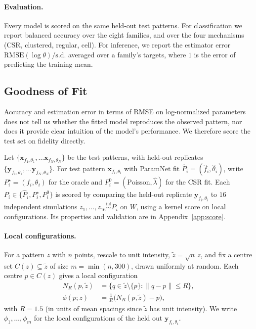 \documentclass[twoside]{article}
\newcommand{\pc}{\mathbf{x}}
\newcommand{\rc}{\mathbf{y}}
\begin{document}
\paragraph{Evaluation.} Every model is scored on the same held-out test patterns. For classification we report
balanced accuracy over the eight families, and over the four mechanisms (CSR, clustered, regular, cell). For
inference, we report the estimator error $\mathrm{RMSE}(\log\theta)/\mathrm{s.d.}$ averaged over a family's targets,
where $1$ is the error of predicting the training mean.


\subsection{Goodness of Fit}
\label{sec:score}

Accuracy and estimation error in terms of RMSE on log-normalized parameters does not tell us whether the fitted model reproduces the observed pattern, nor does it provide clear intuition of the model's performance. We therefore score the test set on fidelity directly.

Let $\{\pc_{f_1, \theta_1}, \dots \pc_{f_N, \theta_N}\}$ be the test patterns, with held-out replicates $\{\rc_{f_1, \theta_1}, \dots \rc_{f_N, \theta_N}\}$. For test pattern $\pc_{f_i, \theta_i}$ with ParamNet fit $\hat P_i=(\hat f_i,\hat\theta_i)$, write $P^\star_i=(f_i,\theta_i)$ for the oracle and $P^0_i = (\text{Poisson}, \hat \lambda)$ for the CSR fit. Each $P_i\in\{\hat P_i,P^\star_i,P^0_i\}$ is scored by comparing the held-out replicate $\rc_{f_i, \theta_i}$ to $16$ independent simulations $z_1,\dots,z_{16}\stackrel{\text{iid}}\sim P_i$ on $W$, using a kernel score on local configurations. Its properties and validation are in Appendix~\ref{app:score}.

\paragraph{Local configurations.}
For a pattern $z$ with $n$ points, rescale to unit intensity, $\tilde z=\sqrt n\,z$, and fix a centre set $C(z)\subseteq\tilde z$ of size $m=\min(n,300)$, drawn uniformly at random. Each centre $p\in C(z)$ gives a local configuration
\begin{align}
    N_R(p,\tilde z) &= \{q\in\tilde z\setminus\{p\}:\|q-p\|\le R\}, \\
    \phi(p;z) &= \frac1R\big(N_R(p,\tilde z)-p\big),
\end{align}
with $R=1.5$ (in units of mean spacings since $\tilde z$ has unit intensity). We write $\phi_1,\dots,\phi_m$ for the local configurations of the held out $\rc_{f_i, \theta_i}$.
\end{document}
